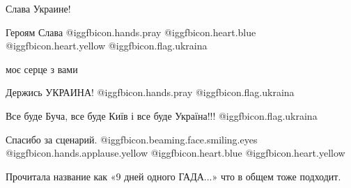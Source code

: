  
 
 
 
 
\zzSecCmt

\begin{itemize} %
Слава Украине!


Героям Слава  @igg{fbicon.hands.pray}  @igg{fbicon.heart.blue}
@igg{fbicon.heart.yellow} @igg{fbicon.flag.ukraina}


моє серце з вами


Держись УКРАИНА! @igg{fbicon.hands.pray} @igg{fbicon.flag.ukraina}


Все буде Буча, все буде Київ і все буде Україна!!! @igg{fbicon.flag.ukraina}


Спасибо за сценарий. @igg{fbicon.beaming.face.smiling.eyes}
@igg{fbicon.hands.applause.yellow}  @igg{fbicon.heart.blue}
@igg{fbicon.heart.yellow} 


Прочитала название как «9 дней одного ГАДА...» что в общем тоже подходит.

\end{itemize} %
